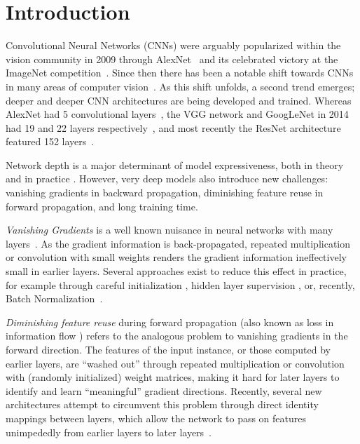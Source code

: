 \documentclass[runningheads]{llncs}
\begin{document}
\section{Introduction}

\label{sec_intro}



Convolutional Neural Networks (CNNs) were arguably popularized within the vision community in 2009 through AlexNet~\cite{krizhevsky2009learning} and its celebrated victory at the ImageNet competition~\cite{deng2009imagenet}.
Since then there has been a notable shift towards CNNs in many areas of computer vision~\cite{krizhevsky2012imagenet,sermanet2013overfeat,simonyan2014very,springenberg2014striving,szegedy2015going,he2015deep}. As this shift unfolds, a second trend emerges; deeper and deeper CNN architectures are being developed and trained. Whereas AlexNet had 5 convolutional layers~\cite{krizhevsky2009learning}, the VGG network and GoogLeNet in 2014 had 19 and 22 layers respectively~\cite{simonyan2014very,szegedy2015going}, and most recently the ResNet architecture featured 152 layers~\cite{he2015deep}.

Network depth is a major determinant of model expressiveness, both in theory \cite{haastad1991power,haastad1987computational} and in practice \cite{he2015deep,simonyan2014very,szegedy2015going}. However, very deep models also introduce new challenges: vanishing gradients in backward propagation, diminishing feature reuse in forward propagation, and long training time.

\emph{Vanishing Gradients} is a well known nuisance in neural networks with many layers~\cite{bengio1994learning}. As the gradient information is back-propagated, repeated multiplication or convolution with small weights renders the gradient information ineffectively small in earlier layers. Several approaches exist to reduce this effect in practice, for example through careful initialization \cite{glorot2010understanding}, hidden layer supervision \cite{lee2014deeply}, or, recently, Batch Normalization~\cite{ioffe2015batch}.

\emph{Diminishing feature reuse} during forward propagation (also known as loss in information flow \cite{srivastava2015highway}) refers to the analogous problem to vanishing gradients in the forward direction. The features of the input instance, or those computed by earlier layers, are ``washed out'' through repeated multiplication or convolution with (randomly initialized) weight matrices, making it hard for later layers to identify and learn ``meaningful'' gradient directions. Recently, several new architectures attempt to circumvent this problem through direct identity mappings between layers, which allow the network to pass on features unimpededly from earlier layers to later layers~\cite{he2015deep,srivastava2015highway}.
\end{document}
